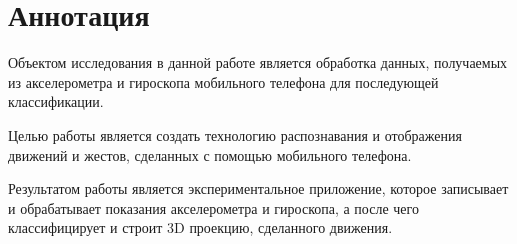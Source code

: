 \section*{Аннотация}

Объектом исследования в данной работе является обработка данных, получаемых из акселерометра и гироскопа мобильного телефона для последующей классификации.

Целью работы является создать технологию распознавания и отображения движений и жестов, сделанных с помощью мобильного телефона.

Результатом работы является экспериментальное приложение, которое записывает и обрабатывает показания акселерометра и гироскопа, а после чего классифицирует и строит 3D проекцию, сделанного движения.